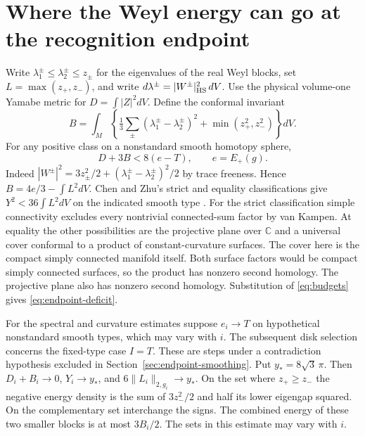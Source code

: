 \section{Where the Weyl energy can go at the recognition endpoint}
\label{sec:endpoint-charge}

Write \(\lambda_1^\pm\le\lambda_2^\pm\le z_\pm\) for the eigenvalues
of the real Weyl blocks, set \(L=\max(z_+,z_-)\), and write
\(d\lambda^\pm=|W^\pm|^2_{\rm HS}\,dV\). Use the physical
volume-one Yamabe metric for \(D=\int|Z|^2dV\). Define the
conformal invariant
\[
 B=\int_M\left\{\tfrac13\sum_{\pm}(\lambda_1^\pm-\lambda_2^\pm)^2
                   +\min(z_+^2,z_-^2)\right\}dV .
\]
For any positive class on a nonstandard smooth homotopy sphere,
\begin{equation}\label{eq:endpoint-deficit}
                 D+3B < 8(e-T),\qquad e=E_+(g).
\end{equation}
Indeed \(|W^\pm|^2=3z_\pm^2/2+(\lambda_1^\pm-\lambda_2^\pm)^2/2\)
by trace freeness. Hence \(B=4e/3-\int L^2dV\).
Chen and Zhu's strict and equality classifications give
\(Y^2<36\int L^2dV\) on the indicated smooth type
\cite[Theorems 1.4 and 1.6]{ChenZhu2014Conformal}.
For the strict classification simple connectivity excludes every
nontrivial connected-sum factor by van Kampen. At equality the other
possibilities are the projective plane over \(\mathbb C\) and a
universal cover conformal to a product of constant-curvature surfaces.
The cover here is the compact simply connected manifold itself.
Both surface factors would be compact simply connected surfaces, so
the product has nonzero second homology. The projective plane also
has nonzero second homology. Substitution of \eqref{eq:budgets} gives
\eqref{eq:endpoint-deficit}.

For the spectral and curvature estimates suppose \(e_i\to T\)
on hypothetical nonstandard smooth types, which may vary with \(i\).
The subsequent disk selection concerns the fixed-type case \(I=T\).
These are steps under a contradiction hypothesis excluded in
Section~\ref{sec:endpoint-smoothing}. Put
\(y_*=8\sqrt3\,\pi\). Then \(D_i+B_i\to0\),
\(Y_i\to y_*\), and \(6\|L_i\|_{2,g_i}\to y_*\).
On the set where \(z_+\ge z_-\) the negative energy density is
the sum of \(3z_-^2/2\) and half its lower eigengap squared.
On the complementary set interchange the signs. The combined
energy of these two smaller blocks is at most \(3B_i/2\).
The sets in this estimate may vary with \(i\).

